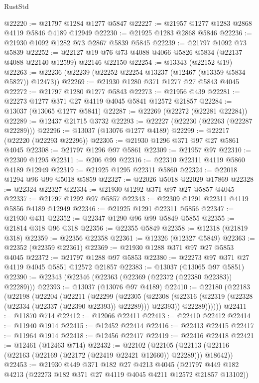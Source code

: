 \begin{lexlean}{RustStd}
\begin{coremodule}
@22220 := @21797 @1284 @1277 @5847
@22227 := @21957 @1277 @1283 @2868 @4119 @5846 @4189 @12949
@22230 := @21925 @1283 @2868 @5846
@22236 := @21930 @1092 @1282 @73 @2867 @5839 @5845
@22239 := @21797 @1092 @73 @5839
@22252 := @22127 @19 @76 @73 @4088 @4066 @5826 @5834 (@22137 @4088 @22140 @12599) @22146 @22150
@22254 := @13343 (@22152 @19)
@22263 := @22236 (@22239 (@22252 @22254 @13237 (@12467 (@13359 @5834 @5827)) @12473))
@22269 := @21930 @1280 @371 @1277 @27 @5843 @4045
@22272 := @21797 @1280 @1277 @5843
@22273 := @21956 @439
@22281 := @22273 @1277 @371 @27 @4119 @4045 @5841 @12572 @21857
@22284 := @13037 (@13065 @1277 @5841)
@22287 := @22269 (@22272 (@22281 @22284))
@22289 := @12437 @21715 @3732
@22293 := @22227 (@22230 (@22263 (@22287 @22289)))
@22296 := @13037 (@13076 @1277 @4189)
@22299 := @22217 (@22220 (@22293 @22296))
@22305 := @21930 @1296 @371 @97 @27 @5861 @4045
@22308 := @21797 @1296 @97 @5861
@22309 := @21957 @97
@22310 := @22309 @1295
@22311 := @206 @99
@22316 := @22310 @22311 @4119 @5860 @4189 @12949
@22319 := @21925 @1295 @22311 @5860
@22324 := @22018 @1294 @96 @99 @5018 @5859
@22327 := @22026 @5018 @22029 @17869
@22328 := @22324 @22327
@22334 := @21930 @1292 @371 @97 @27 @5857 @4045
@22337 := @21797 @1292 @97 @5857
@22343 := @22309 @1291 @22311 @4119 @5856 @4189 @12949
@22346 := @21925 @1291 @22311 @5856
@22347 := @21930 @431
@22352 := @22347 @1290 @96 @99 @5849 @5855
@22355 := @21814 @318 @96 @318
@22356 := @22355 @5849
@22358 := @12318 (@21819 @318)
@22359 := @22356 @22358
@22361 := @12326 (@12327 @5849)
@22363 := @22352 (@22359 @22361)
@22369 := @21930 @1288 @371 @97 @27 @5853 @4045
@22372 := @21797 @1288 @97 @5853
@22380 := @22273 @97 @371 @27 @4119 @4045 @5851 @12572 @21857
@22383 := @13037 (@13065 @97 @5851)
@22390 := @22343 (@22346 (@22363 (@22369 (@22372 (@22380 @22383)) @22289)))
@22393 := @13037 (@13076 @97 @4189)
@22410 := @22180
    (@22183
      (@22198
        (@22204
          (@22211
            (@22299
              (@22305
                (@22308 (@22316 (@22319 (@22328 (@22334 (@22337 (@22390 @22393)) @22289))) @22393))
                @22289))))))
@22411 := @11870 @714
@22412 := @12066 @22411
@22413 := @22410 @22412
@22414 := @11940 @1914
@22415 := @12452 @22414
@22416 := @22413 @22415
@22417 := @11964 @1914
@22418 := @12456 @22417
@22419 := @22416 @22418
@22421 := @12461 (@12463 @714)
@22432 := @22102
    (@22105 (@22113 (@22116 (@22163 (@22169 (@22172 (@22419 @22421 @12660)) @22289))) @18642))
@22453 := @21930
    @449
    @371
    @182
    @27
    @4213
    @4045
    (@21797 @449 @182 @4213 (@22273 @182 @371 @27 @4119 @4045 @4211 @12572 @21857 @13102))

\end{coremodule}
\end{lexlean}
